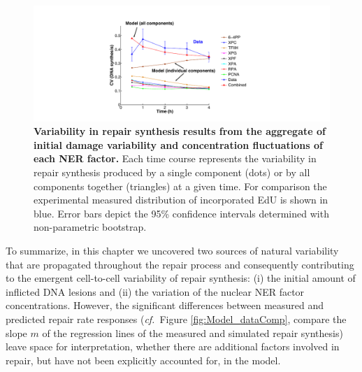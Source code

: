\begin{figure}[h]
	\begin{center}
		\includegraphics[width=1\textwidth]{Abbildungen/figure3_8.pdf}
		\caption{\textbf{Variability in repair synthesis results from the aggregate of initial damage variability and concentration fluctuations of each NER factor.} Each time course represents the variability in repair synthesis produced by a single component (dots) or by all components together (triangles) at a given time. For comparison the experimental measured distribution of incorporated EdU is shown in blue. Error bars depict the 95\% confidence intervals determined with non-parametric bootstrap.}
		\label{fig:CV_Var_comp}
	\end{center}
\end{figure}



To summarize, in this chapter we uncovered two sources of natural variability that are propagated throughout the repair process and consequently contributing to the emergent cell-to-cell variability of repair synthesis: (i) the initial amount of inflicted DNA lesions and (ii) the variation of the nuclear NER factor concentrations. 
However, the significant differences between measured and predicted repair rate responses (\textit{cf.}\ Figure \ref{fig:Model_dataComp}, compare the slope $m$ of the regression lines of the measured and simulated repair synthesis) leave space for interpretation, whether there are additional factors involved in repair, but have not been explicitly accounted for, in the model.

